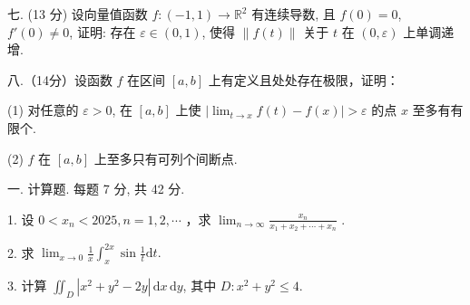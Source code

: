 \documentclass{examcollection}
\begin{document}
{\begin{minipage}{\textwidth}
七. (13 分) 设向量值函数 $f: (-1, 1) \to \mathbb{R}^2$ 有连续导数, 且 $f(0) = 0$, $f'(0) \neq 0$, 证明: 存在 $\varepsilon \in (0, 1)$, 使得 $\| f(t) \|$ 关于 $t$ 在 $(0, \varepsilon)$ 上单调递增.\par
八.（14分）设函数 $f$ 在区间 $[a,b]$ 上有定义且处处存在极限，证明：\par
(1) 对任意的 $\varepsilon > 0$, 在 $[a, b]$ 上使 $\left|\lim_{t \to x} f(t) - f(x)\right| > \varepsilon$ 的点 $x$ 至多有有限个.\par
(2) $f$ 在 $[a, b]$ 上至多只有可列个间断点.\par
{}\smallskip
一. 计算题. 每题 7 分, 共 42 分.\par
1. 设  $0 < x_{n} < 2025, n = 1, 2, \cdots$ ，求  $\lim_{n \to \infty} \frac{x_{n}}{x_{1} + x_{2} + \cdots + x_{n}}$ .\par
2. 求 $\lim_{x\to 0}\frac{1}{x}\int_{x}^{2x}\sin \frac{1}{t}\mathrm{d}t.$\par
3. 计算 $\iint_{D} |x^{2} + y^{2} - 2y| \, \mathrm{d}x \, \mathrm{d}y$, 其中 $D: x^{2} + y^{2} \leq 4$.\par
\end{minipage}}
\ifdim\dimexpr\ht\proofbox+\dp\proofbox\relax>\textheight
\noindent\resizebox{!}{\textheight}{\usebox{\proofbox}}\else\noindent\usebox{\proofbox}\fi\clearpage
\end{document}
